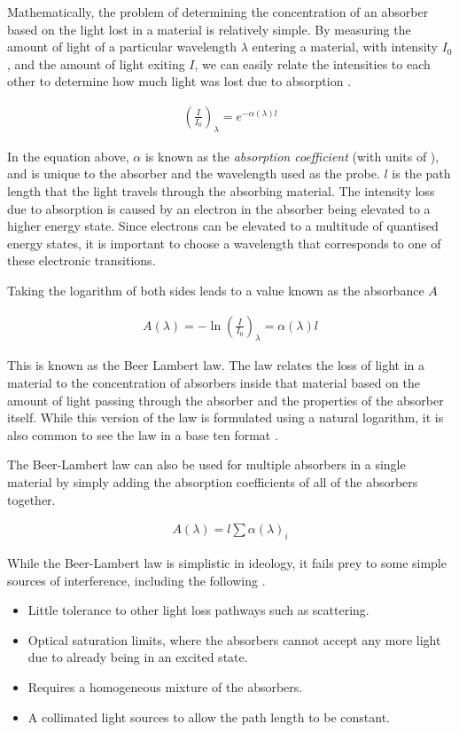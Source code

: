 Mathematically, the problem of determining the concentration of an absorber
based on the light lost in a material is relatively simple. By measuring the
amount of light of a particular wavelength $\lambda$ entering a material, with
intensity $I_0$, and the amount of light exiting $I$, we can easily relate the
intensities to each other to determine how much light was lost due to
absorption \cite{Hollas:2004uh}.

\begin{align}
  \left(\frac{I}{I_0}\right)_\lambda = e^{-\alpha(\lambda)l}
\end{align}

In the equation above, $\alpha$ is known as the \emph{absorption coefficient}
(with units of \icm), and is unique to the absorber and the wavelength
used as the probe. $l$ is the path length that the light travels through the
absorbing material. The intensity loss due to absorption is caused by an
electron in the absorber being elevated to a higher energy state. Since
electrons can be elevated to a multitude of quantised energy states, it is
important to choose a wavelength that corresponds to one of these electronic
transitions.

Taking the logarithm of both sides leads to a value known as the absorbance $A$

\begin{align*}
  A(\lambda)=-\ln\left(\frac{I}{I_0}\right)_\lambda = \alpha(\lambda)l\label{eq:beer}
\end{align*}

This is known as the Beer Lambert law. The law relates the loss of light in a
material to the concentration of absorbers inside that material based on the
amount of light passing through the absorber and the properties of the absorber
itself.  While this version of the  law is formulated using a natural logarithm, it is also common to see the law in a base ten format \cite{Hollas:2004uh}.

The Beer-Lambert law can also be used for multiple absorbers in a single material by simply adding the absorption coefficients of all of the absorbers together.

\begin{align*}
  A(\lambda) = l\sum\alpha(\lambda)_i
\end{align*}

While the Beer-Lambert law is simplistic in ideology, it fails prey to some simple sources of interference, including the following \cite{Skoog:1994wg}.
\begin{itemize}
  \item Little tolerance to other light loss pathways such as scattering.
  \item Optical saturation limits, where the absorbers cannot accept any more light due to already being in an excited state.
  \item Requires a homogeneous mixture of the absorbers.
  \item A collimated light sources to allow the path length to be constant.
\end{itemize}

